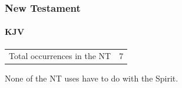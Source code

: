 			
		
		
	\subsubsection{New Testament} %
		\label{WITHDRAW-NT}
	
		\paragraph{KJV}
			\label{WITHDRAW-NT-KJV}		
	
			\begin{tabular}{ll}
				Total occurrences in the NT & 7
			\end{tabular}
			
			None of the NT uses have to do with the Spirit.
			
			
		
				
				
			
